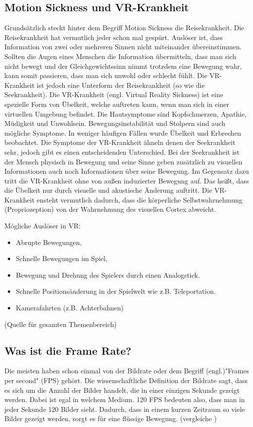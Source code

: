 \subsection{Motion Sickness und VR-Krankheit} \label{simon_motionsickness}
Grundsätzlich steckt hinter dem Begriff Motion Sickness die Reisekrankheit. Die Reisekrankheit hat vermutlich jeder schon mal gespürt. Auslöser ist, dass Information von zwei oder mehreren Sinnen nicht miteinander übereinstimmen. Sollten die Augen eines Menschen die Information übermitteln, dass man sich nicht bewegt und der Gleichgewichtssinn nimmt trotzdem eine Bewegung wahr, kann somit passieren, dass man sich unwohl oder schlecht fühlt. Die VR-Krankheit ist jedoch eine Unterform der Reisekrankheit (so wie die Seekrankheit).
Die VR-Krankheit (engl. Virtual Reality Sickness) ist eine spezielle Form von Übelkeit, welche auftreten kann, wenn man sich in einer virtuellen Umgebung befindet. Die Hautsymptome sind Kopfschmerzen, Apathie, Müdigkeit und Unwohlsein. Bewegungsinstabilität und Stolpern sind auch mögliche Symptome. In weniger häufigen Fällen wurde Übelkeit und Erbrechen beobachtet. Die Symptome der VR-Krankheit ähneln denen der Seekrankheit sehr, jedoch gibt es einen entscheidenden Unterschied. Bei der Seekrankheit ist der Mensch physisch in Bewegung und seine Sinne geben zusätzlich zu visuellen Informationen auch noch Informationen über seine Bewegung. Im Gegensatz dazu tritt die VR-Krankheit ohne von außen induzierter Bewegung auf. Das heißt, dass die Übelkeit nur durch visuelle und akustische Änderung auftritt. Die VR-Krankheit ensteht vermutlich dadurch, dass die körperliche Selbstwahrnehmung (Propriozeption) von der Wahrnehmung des visuellen Cortex abweicht.

\vspace{1cm}
Mögliche Auslöser in VR:
\begin{itemize}
	\item Abrupte Bewegungen,
	\item Schnelle Bewegungen im Spiel,
	\item Bewegung und Drehung des Spielers durch einen Analogstick.
	\item Schnelle Positionsänderung in der Spielwelt wie z.B. Teleportation.
	\item Kamerafahrten (z.B. Achterbahnen)
\end{itemize}

(Quelle für gesamten Themenbereich)
\cite{_motionsickness}
\cite{_vr_quovadis}


\subsection{Was ist die Frame Rate?}
Die meisten haben schon einmal von der Bildrate oder dem Begriff (engl.)"Frames per second" (FPS) gehört. Die wissenschaftliche Definition der Bildrate sagt, dass es sich um die Anzahl der Bilder handelt, die in einer einzigen Sekunde gezeigt werden. Dabei ist egal in welchem Medium. 120 FPS bedeuten also, dass man in jeder Sekunde 120 Bilder sieht. Dadurch, dass in einem kurzen Zeitraum so viele Bilder gezeigt werden, sorgt es für eine flüssige Bewegung.
(vergleiche \cite{_vr_linde})

